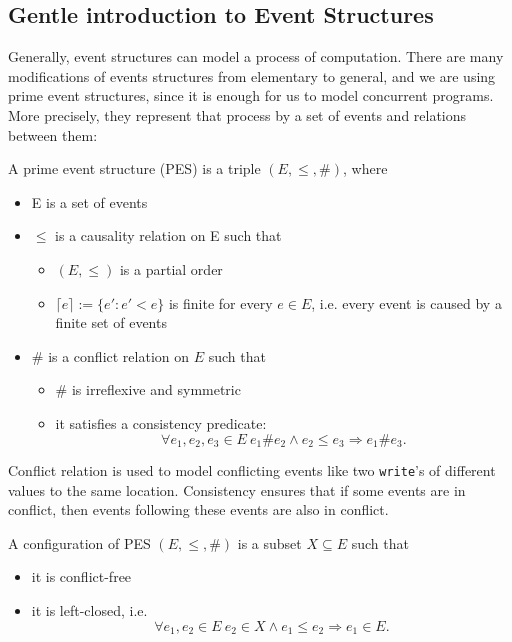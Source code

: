 \subsection{Gentle introduction to Event Structures}

Generally, event structures can model a process of computation. 
There are many modifications of events structures from elementary to general, 
and we are using prime event structures, since it is enough for us to model 
concurrent programs. More precisely, they represent that process by a set of events 
and relations between them: 
\begin{definition}
A prime event structure (PES) is a triple $(E, \leq, \#)$, where
\begin{itemize}
  \item E is a set of events
  \item $\leq$ is a causality relation on E such that 
  \begin{itemize}
    \item $ (E, \leq) $ is a partial order
    \item $\lceil e \rceil := \{ e' : e' < e \}$ is finite for every $e \in E$, 
    i.e. every event is caused by a finite set of events
  \end{itemize}
  \item $\#$ is a conflict relation on $E$ such that
  \begin{itemize}
    \item $\#$ is irreflexive and symmetric
    \item it satisfies a consistency predicate:
    $$\forall e_1, e_2, e_3 \in E \ e_1 \# e_2 \land e_2 \leq e_3 \Rightarrow e_1 \# e_3.$$
  \end{itemize}
\end{itemize}
\end{definition}

Conflict relation is used to model conflicting events like two \texttt{write}'s 
of different values to the same location.
Consistency ensures that if some events are in conflict, then events 
following these events are also in conflict.

\begin{definition}
A configuration of PES $(E, \leq, \#)$ is a subset $X \subseteq E$ such that
\begin{itemize}
  \item it is conflict-free
  \item it is left-closed, i.e. $$\forall e_1, e_2 \in E \ e_2 \in X \land e_1 \leq e_2 \Rightarrow e_1 \in E.$$
\end{itemize}
\end{definition}

